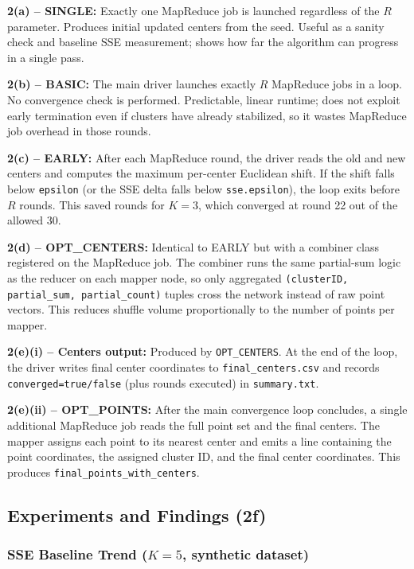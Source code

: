 \documentclass[11pt]{article}
\begin{document}
\textbf{2(a) -- SINGLE:} Exactly one MapReduce job is launched regardless of the $R$ parameter. Produces initial updated centers from the seed. Useful as a sanity check and baseline SSE measurement; shows how far the algorithm can progress in a single pass.

\textbf{2(b) -- BASIC:} The main driver launches exactly $R$ MapReduce jobs in a loop. No convergence check is performed. Predictable, linear runtime; does not exploit early termination even if clusters have already stabilized, so it wastes MapReduce job overhead in those rounds.

\textbf{2(c) -- EARLY:} After each MapReduce round, the driver reads the old and new centers and computes the maximum per-center Euclidean shift. If the shift falls below \texttt{epsilon} (or the SSE delta falls below \texttt{sse.epsilon}), the loop exits before $R$ rounds. This saved rounds for $K{=}3$, which converged at round 22 out of the allowed 30.

\textbf{2(d) -- OPT\_CENTERS:} Identical to EARLY but with a combiner class registered on the MapReduce job. The combiner runs the same partial-sum logic as the reducer on each mapper node, so only aggregated \texttt{(clusterID, partial\_sum, partial\_count)} tuples cross the network instead of raw point vectors. This reduces shuffle volume proportionally to the number of points per mapper.

\textbf{2(e)(i) -- Centers output:} Produced by \texttt{OPT\_CENTERS}. At the end of the loop, the driver writes final center coordinates to \texttt{final\_centers.csv} and records \texttt{converged=true/false} (plus rounds executed) in \texttt{summary.txt}.

\textbf{2(e)(ii) -- OPT\_POINTS:} After the main convergence loop concludes, a single additional MapReduce job reads the full point set and the final centers. The mapper assigns each point to its nearest center and emits a line containing the point coordinates, the assigned cluster ID, and the final center coordinates. This produces \texttt{final\_points\_with\_centers}.

\subsection{Experiments and Findings (2f)}

\subsubsection*{SSE Baseline Trend ($K=5$, synthetic dataset)}
\end{document}
